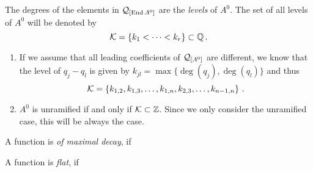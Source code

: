 \begin{defn}
\begin{s-rem}
\begin{enumerate}
    \end{enumerate}
  \end{s-rem}
  The degrees of the elements in $\mathcal{Q}_{[\operatorname{End} A^0]}$ are the
  \emph{levels} of $A^0$.
  The set of all levels of $A^0$ will be denoted by
  \[
    \mathcal{K}=\{k_1<\dots<k_r\} \subset \mathbb{Q} \,.
  \]
  \begin{s-rem}
    \begin{enumerate}
      \item If we assume that all leading coefficients of $\mathcal{Q}_{[A^0]}$ are
        different, we know that the level of $q_j-q_l$ is given by
        $k_{jl}=\max\{\deg(q_j),\deg(q_l)\}$ and thus
        \[
          \mathcal{K}=\left\{
            k_{1,2},
            k_{1,3},\dots,
            k_{1,n},
            k_{2,3},\dots,
            k_{n-1,n}
          \right\}\,.
        \]
      \item $A^0$ is unramified if and only if $\mathcal{K}\subset\mathbb{Z}$. Since we only
        consider the unramified case, this will be always the case.
    \end{enumerate}
  \end{s-rem}
\end{defn}

\begin{defn}
  \begin{comment}
    See \cite{hotta2008}
  \end{comment}
  A function is \emph{of maximal decay}, if \TODO{}

  A function is \emph{flat}, if \TODO{}
\end{defn}

